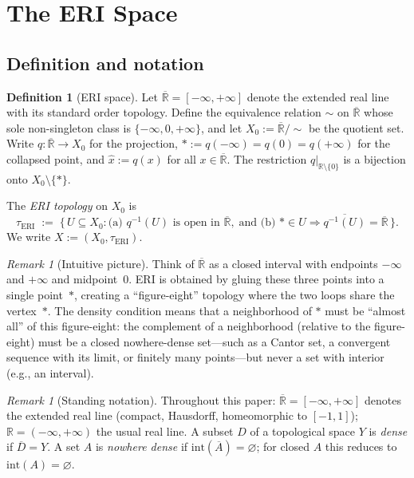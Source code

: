 \documentclass[11pt]{article}
\theoremstyle{definition}
\newtheorem{definition}[theorem]{Definition}
\theoremstyle{remark}
\newtheorem{remark}[theorem]{Remark}
\begin{document}
\section{The ERI Space}\label{sec:construction}

\subsection{Definition and notation}

\begin{definition}[ERI space]\label{def:ERI}
Let $\overline{\mathbb{R}} = [-\infty,+\infty]$ denote the extended real
line with its standard order topology.  Define the equivalence relation
$\sim$ on $\overline{\mathbb{R}}$ whose sole non-singleton class is
$\{-\infty, 0, +\infty\}$, and let
$X_0 := \overline{\mathbb{R}}/{\sim}$
be the quotient set.  Write $q:\overline{\mathbb{R}} \to X_0$ for the
projection, $\ast := q(-\infty) = q(0) = q(+\infty)$ for the collapsed
point, and $\hat{x} := q(x)$ for all
$x \in \overline{\mathbb{R}}$.
The restriction $q|_{\mathbb{R}\setminus\{0\}}$ is a bijection onto
$X_0 \setminus \{\ast\}$.

The \emph{ERI topology} on $X_0$ is
\[
\tau_{\mathrm{ERI}} \;:=\;
\bigl\{\, U \subseteq X_0 :
  \text{(a) } q^{-1}(U) \text{ is open in } \overline{\mathbb{R}},\;
  \text{and (b) } \ast \in U \Rightarrow \overline{q^{-1}(U)} =
  \overline{\mathbb{R}} \,\bigr\}.
\]
We write $X := (X_0, \tau_{\mathrm{ERI}})$.
\end{definition}

\begin{remark}[Intuitive picture]\label{rem:picture}
Think of $\overline{\mathbb{R}}$ as a closed interval with endpoints
$-\infty$ and $+\infty$ and midpoint~$0$.
ERI is obtained by gluing these three points into a single
point~$\ast$, creating a ``figure-eight'' topology where the two
loops share the vertex~$\ast$.
The density condition means that a neighborhood of $\ast$ must be
``almost all'' of this figure-eight: the complement of a
neighborhood (relative to the figure-eight) must be a closed
nowhere-dense set---such as a Cantor set, a convergent sequence
with its limit, or finitely many points---but never a set with
interior (e.g., an interval).
\end{remark}

\begin{remark}[Standing notation]\label{rem:notation}
Throughout this paper:
$\overline{\mathbb{R}} = [-\infty,+\infty]$ denotes the extended real
line (compact, Hausdorff, homeomorphic to $[-1,1]$);
$\mathbb{R} = (-\infty,+\infty)$ the usual real line.
A subset $D$ of a topological space $Y$ is \emph{dense} if
$\overline{D} = Y$.
A set $A$ is \emph{nowhere dense} if
$\mathrm{int}(\overline{A}) = \varnothing$;
for closed $A$ this reduces to $\mathrm{int}(A) = \varnothing$.
\end{remark}
\end{document}
